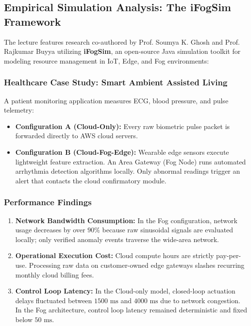 \documentclass[11pt,a4paper,openany]{report}
\begin{document}
\subsection{Empirical Simulation Analysis: The iFogSim Framework}
The lecture features research co-authored by Prof. Soumya K. Ghosh and Prof. Rajkumar Buyya utilizing \textbf{iFogSim}, an open-source Java simulation toolkit for modeling resource management in IoT, Edge, and Fog environments:

\subsubsection{Healthcare Case Study: Smart Ambient Assisted Living}
A patient monitoring application measures ECG, blood pressure, and pulse telemetry:
\begin{itemize}[leftmargin=*]
  \item \textbf{Configuration A (Cloud-Only):} Every raw biometric pulse packet is forwarded directly to AWS cloud servers.
  \item \textbf{Configuration B (Cloud-Fog-Edge):} Wearable edge sensors execute lightweight feature extraction. An Area Gateway (Fog Node) runs automated arrhythmia detection algorithms locally. Only abnormal readings trigger an alert that contacts the cloud confirmatory module.
\end{itemize}

\subsubsection{Performance Findings}
\begin{enumerate}[leftmargin=*]
  \item \textbf{Network Bandwidth Consumption:} In the Fog configuration, network usage decreases by over $90\%$ because raw sinusoidal signals are evaluated locally; only verified anomaly events traverse the wide-area network.
  \item \textbf{Operational Execution Cost:} Cloud compute hours are strictly pay-per-use. Processing raw data on customer-owned edge gateways slashes recurring monthly cloud billing fees.
  \item \textbf{Control Loop Latency:} In the Cloud-only model, closed-loop actuation delays fluctuated between $1500\text{ ms}$ and $4000\text{ ms}$ due to network congestion. In the Fog architecture, control loop latency remained deterministic and fixed below $50\text{ ms}$.
\end{enumerate}
\end{document}
